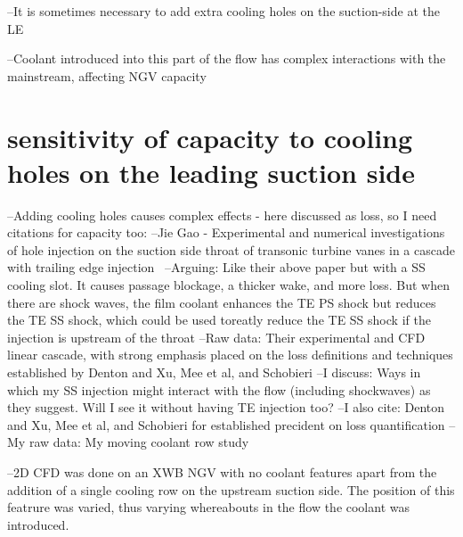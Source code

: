 \documentclass[a4paper, 11pt, twoside]{report}
\begin{document}

--It is sometimes necessary to add extra cooling holes on the suction-side at the LE

--Coolant introduced into this part of the flow has complex interactions with the mainstream, affecting NGV capacity
 
 
\section{sensitivity of capacity to cooling holes on the leading suction side}

--Adding cooling holes causes complex effects - here discussed as loss, so I need citations for capacity too:
--Jie Gao - Experimental and numerical investigations of hole injection on the suction side throat of transonic turbine vanes in a cascade with trailing edge injection~\cite{gao_te_and_film_cooling}
		--Arguing: Like their above paper but with a SS cooling slot. It causes passage blockage, a thicker wake, and more loss. But when there are shock waves, the film coolant enhances the TE PS shock but reduces the TE SS shock, which could be used toreatly reduce the TE SS shock if the injection is upstream of the throat
		--Raw data: Their experimental and CFD linear cascade, with strong emphasis placed on the loss definitions and techniques established by Denton and Xu, Mee et al, and Schobieri
		--I discuss: Ways in which my SS injection might interact with the flow (including shockwaves) as they suggest. Will I see it without having TE injection too?
		--I also cite: Denton and Xu, Mee et al, and Schobieri for established precident on loss quantification
		--My raw data: My moving coolant row study

--2D CFD was done on an XWB NGV with no coolant features apart from the addition of a single cooling row on the upstream suction side. The position of this featrure was varied, thus varying whereabouts in the flow the coolant was introduced.
\end{document}
